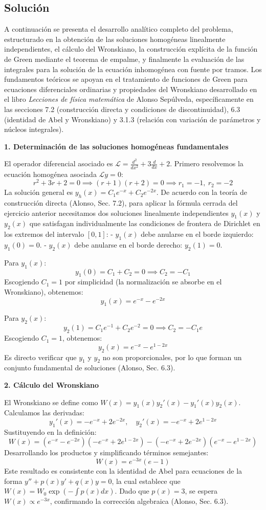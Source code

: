 \documentclass[a4paper]{article}
\begin{document}
\subsection{Solución}

A continuación se presenta el desarrollo analítico completo del problema, estructurado en la obtención de las soluciones homogéneas linealmente independientes, el cálculo del Wronskiano, la construcción explícita de la función de Green mediante el teorema de empalme, y finalmente la evaluación de las integrales para la solución de la ecuación inhomogénea con fuente por tramos. Los fundamentos teóricos se apoyan en el tratamiento de funciones de Green para ecuaciones diferenciales ordinarias y propiedades del Wronskiano desarrollado en el libro \textit{Lecciones de física matemática} de Alonso Sepúlveda, específicamente en las secciones 7.2 (construcción directa y condiciones de discontinuidad), 6.3 (identidad de Abel y Wronskiano) y 3.1.3 (relación con variación de parámetros y núcleos integrales).

\textbf{1. Determinación de las soluciones homogéneas fundamentales}

El operador diferencial asociado es $\mathscr{L} = \frac{d^2}{dx^2} + 3\frac{d}{dx} + 2$. Primero resolvemos la ecuación homogénea asociada $\mathscr{L}y = 0$:
$$ r^2 + 3r + 2 = 0 \implies (r+1)(r+2)=0 \implies r_1 = -1, \ r_2 = -2 $$
La solución general es $y_h(x) = C_1 e^{-x} + C_2 e^{-2x}$. De acuerdo con la teoría de construcción directa (Alonso, Sec. 7.2), para aplicar la fórmula cerrada del ejercicio anterior necesitamos dos soluciones linealmente independientes $y_1(x)$ y $y_2(x)$ que satisfagan individualmente las condiciones de frontera de Dirichlet en los extremos del intervalo $[0, 1]$:
- $y_1(x)$ debe anularse en el borde izquierdo: $y_1(0) = 0$.
- $y_2(x)$ debe anularse en el borde derecho: $y_2(1) = 0$.

Para $y_1(x)$:
$$ y_1(0) = C_1 + C_2 = 0 \implies C_2 = -C_1 $$
Escogiendo $C_1 = 1$ por simplicidad (la normalización se absorbe en el Wronskiano), obtenemos:
$$ y_1(x) = e^{-x} - e^{-2x} $$

Para $y_2(x)$:
$$ y_2(1) = C_1 e^{-1} + C_2 e^{-2} = 0 \implies C_2 = -C_1 e $$
Escogiendo $C_1 = 1$, obtenemos:
$$ y_2(x) = e^{-x} - e^{1-2x} $$
Es directo verificar que $y_1$ y $y_2$ no son proporcionales, por lo que forman un conjunto fundamental de soluciones (Alonso, Sec. 6.3).

\textbf{2. Cálculo del Wronskiano}

El Wronskiano se define como $W(x) = y_1(x)y_2'(x) - y_1'(x)y_2(x)$. Calculamos las derivadas:
$$ y_1'(x) = -e^{-x} + 2e^{-2x}, \quad y_2'(x) = -e^{-x} + 2e^{1-2x} $$
Sustituyendo en la definición:
$$ W(x) = (e^{-x} - e^{-2x})(-e^{-x} + 2e^{1-2x}) - (-e^{-x} + 2e^{-2x})(e^{-x} - e^{1-2x}) $$
Desarrollando los productos y simplificando términos semejantes:
$$ W(x) = e^{-3x}(e - 1) $$
Este resultado es consistente con la identidad de Abel para ecuaciones de la forma $y'' + p(x)y' + q(x)y = 0$, la cual establece que $W(x) = W_0 \exp(-\int p(x) dx)$. Dado que $p(x)=3$, se espera $W(x) \propto e^{-3x}$, confirmando la corrección algebraica (Alonso, Sec. 6.3).
\end{document}
